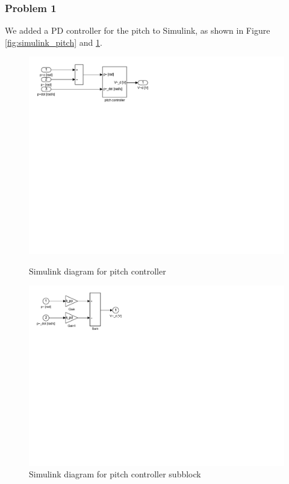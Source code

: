 \subsubsection{Problem 1}
We added a PD controller for the pitch to Simulink, as shown in Figure \ref{fig:simulink_pitch} and \ref{fig:simulink_pitch_controller}.
\begin{figure}[htb]
	\centering
	\begin{minipage}{.45\textwidth}
	    \centering
		\includegraphics[trim={0 16cm 14cm 0}, clip,width=\linewidth]{images/simulink/P2_pitch.pdf}
	    \caption{Simulink diagram for pitch controller}
        \label{fig:simulink_pitch}
    \end{minipage}\hspace{0.1\textwidth}%
    \begin{minipage}{.45\textwidth}
        \centering
	    \includegraphics[trim={0 15.5cm 16cm 0}, clip,width=\linewidth]{images/simulink/P2_pitch_controller.pdf}
	    \caption{Simulink diagram for pitch controller subblock}
        \label{fig:simulink_pitch_controller}
    \end{minipage}
    
\end{figure}



